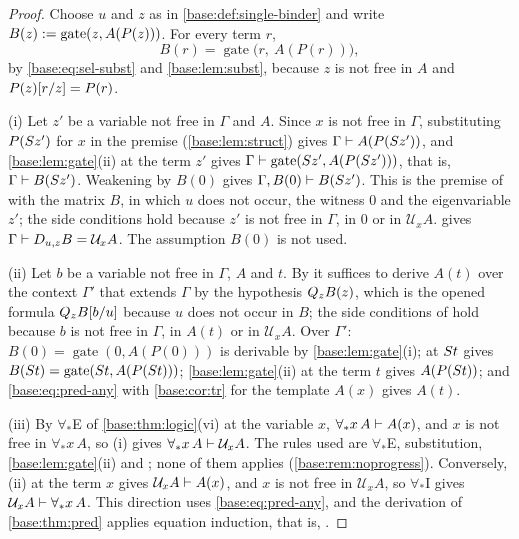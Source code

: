 \begin{proof}
Choose $u$ and $z$ as in \cref{base:def:single-binder} and write
$B(z)\mathrel{:=}\operatorname{gate}(z,A(P(z)))$.  For every term $r$,
\[
 B(r)=\operatorname{gate}\bigl(r,\ A(P(r))\bigr),
\]
by \eqref{base:eq:sel-subst} and \cref{base:lem:subst}, because $z$ is not
free in $A$ and $P(z)[r/z]=P(r)$.

(i) Let $z'$ be a variable not free in $\Gamma$ and $A$.  Since $x$ is not
free in $\Gamma$, substituting $P(S z')$ for $x$ in the premise
(\cref{base:lem:struct}) gives $\Gamma\vdash A(P(S z'))$, and
\cref{base:lem:gate}(ii) at the term $z'$ gives
$\Gamma\vdash\operatorname{gate}(S z',A(P(S z')))$, that is,
$\Gamma\vdash B(S z')$.  Weakening by $B(0)$ gives
$\Gamma,B(0)\vdash B(S z')$.  This is the premise of 
with the matrix $B$, in which $u$ does not occur, the witness $0$ and the
eigenvariable $z'$; the side conditions hold because $z'$ is not free in
$\Gamma$, in $0$ or in $\mathcal U_xA$.   gives
$\Gamma\vdash D_{u,z}B=\mathcal U_xA$.  The assumption $B(0)$ is not used.

(ii) Let $b$ be a variable not free in $\Gamma$, $A$ and $t$.  By
 it suffices to derive $A(t)$ over the context $\Gamma'$ that
extends $\Gamma$ by the hypothesis $Q_{z}B(z)$, which is the opened
formula $Q_{z}B[b/u]$ because $u$ does not occur in $B$; the side
conditions of  hold because $b$ is not free in $\Gamma$, in
$A(t)$ or in $\mathcal U_xA$.  Over $\Gamma'$:
$B(0)=\operatorname{gate}(0,A(P(0)))$ is derivable by
\cref{base:lem:gate}(i);  at $S t$ gives
$B(S t)=\operatorname{gate}(S t,A(P(S t)))$;
\cref{base:lem:gate}(ii) at the term $t$ gives $A(P(S t))$; and
\eqref{base:eq:pred-any} with \cref{base:cor:tr} for the template $A(x)$
gives $A(t)$.

(iii) By $\forall_*$E of \cref{base:thm:logic}(vi) at the variable $x$,
$\forall_* x\,A\vdash A(x)$, and $x$ is not free in $\forall_* x\,A$, so (i)
gives $\forall_* x\,A\vdash\mathcal U_xA$.  The rules used are
$\forall_*$E, substitution, \cref{base:lem:gate}(ii) and ;
none of them applies  (\cref{base:rem:noprogress}).
Conversely, (ii) at the term $x$ gives $\mathcal U_xA\vdash A(x)$, and
$x$ is not free in $\mathcal U_xA$, so $\forall_*$I gives
$\mathcal U_xA\vdash\forall_* x\,A$.  This direction uses
\eqref{base:eq:pred-any}, and the derivation of \cref{base:thm:pred}
applies equation induction, that is, .
\end{proof}

